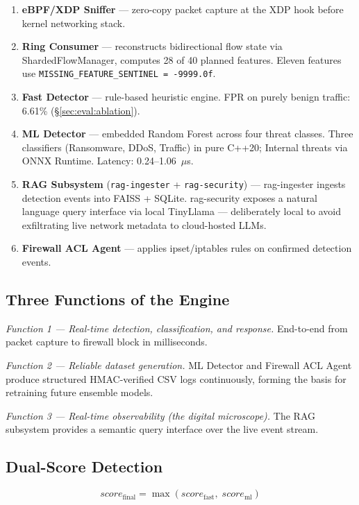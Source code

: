 \documentclass[11pt,a4paper]{article}
\begin{document}
\begin{enumerate}
  \item \textbf{eBPF/XDP Sniffer} --- zero-copy packet capture at the XDP hook before kernel
    networking stack.
  \item \textbf{Ring Consumer} --- reconstructs bidirectional flow state via
    ShardedFlowManager, computes 28 of 40 planned features. Eleven features use
    \texttt{MISSING\_FEATURE\_SENTINEL = -9999.0f}.
  \item \textbf{Fast Detector} --- rule-based heuristic engine. FPR on purely benign traffic:
    6.61\% (\S\ref{sec:eval:ablation}).
  \item \textbf{ML Detector} --- embedded Random Forest across four threat classes. Three
    classifiers (Ransomware, DDoS, Traffic) in pure C++20; Internal threats via ONNX Runtime.
    Latency: 0.24--1.06~$\mu$s.
  \item \textbf{RAG Subsystem} (\texttt{rag-ingester} + \texttt{rag-security}) ---
    rag-ingester ingests detection events into FAISS + SQLite. rag-security exposes a natural
    language query interface via local TinyLlama --- deliberately local to avoid exfiltrating
    live network metadata to cloud-hosted LLMs.
  \item \textbf{Firewall ACL Agent} --- applies ipset/iptables rules on confirmed detection
    events.
\end{enumerate}

\subsection{Three Functions of the Engine}

\emph{Function 1 --- Real-time detection, classification, and response.}
End-to-end from packet capture to firewall block in milliseconds.

\emph{Function 2 --- Reliable dataset generation.}
ML Detector and Firewall ACL Agent produce structured HMAC-verified CSV logs continuously,
forming the basis for retraining future ensemble models.

\emph{Function 3 --- Real-time observability (the digital microscope).}
The RAG subsystem provides a semantic query interface over the live event stream.

\subsection{Dual-Score Detection}

\begin{equation}
  score_{\text{final}} = \max\!\left(score_{\text{fast}},\; score_{\text{ml}}\right)
  \label{eq:dualscore}
\end{equation}
\end{document}
